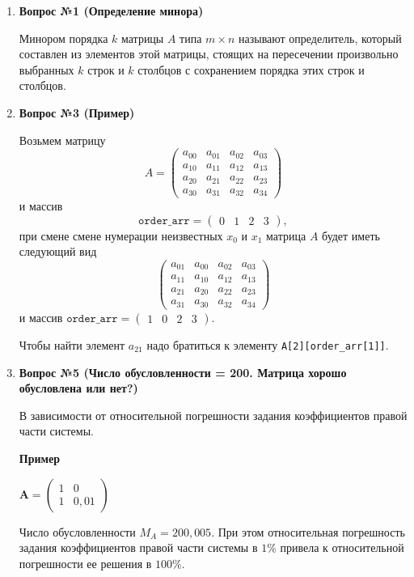 \documentclass[12pt, a4paper]{article}
\begin{document}
	\begin{enumerate}
		\item \textbf{Вопрос №1 (Определение минора)}
		
		Минором порядка $k$ матрицы $A$ типа $m \times n$ называют определитель, который составлен из элементов этой матрицы, стоящих на пересечении произвольно выбранных $k$ строк и $k$ столбцов с сохранением порядка этих строк и столбцов.

		\item \textbf{Вопрос №3 (Пример)}
		
		Возьмем матрицу 
		$$
		A =
		\begin{pmatrix}
			a_{00} & a_{01} & a_{02} & a_{03} \\
			a_{10} & a_{11} & a_{12} & a_{13} \\
			a_{20} & a_{21} & a_{22} & a_{23} \\
			a_{30} & a_{31} & a_{32} & a_{34}
		\end{pmatrix}
		$$
		и массив 
		$$\mathtt{order\_arr}=
		\begin{pmatrix}
			0 & 1 & 2 & 3
		\end{pmatrix},
		$$
		при смене смене нумерации неизвестных $x_0$ и $x_1$ матрица $A$ будет иметь следующий вид
		$$
		\begin{pmatrix}
			a_{01} & a_{00} & a_{02} & a_{03} \\
			a_{11} & a_{10} & a_{12} & a_{13} \\
			a_{21} & a_{20} & a_{22} & a_{23} \\
			a_{31} & a_{30} & a_{32} & a_{34}
		\end{pmatrix}
		$$
		и массив   $\mathtt{order\_arr}=
		\begin{pmatrix}
			1 & 0 & 2 & 3
		\end{pmatrix}.
		$
		
		Чтобы найти элемент $a_{21}$ надо братиться к элементу \texttt{A[2][order\_arr[1]]}.
		\item \textbf{Вопрос №5 (Число обусловленности = 200. Матрица хорошо обусловлена или нет?)}
		
		В зависимости от относительной погрешности задания коэффициентов правой части системы.
		
		\textbf{Пример}
		
		$\mathbf{A}= \left(
		\begin{matrix}
			1 & 0 \\
			1 & 0,01
		\end{matrix}\right)$ 
		
		Число обусловленности $M_{A}=200,005$. При этом относительная погрешность задания коэффициентов правой части системы в $1\%$ привела к относительной погрешности ее решения в $100\%$.
		

\end{enumerate}
\end{document}

